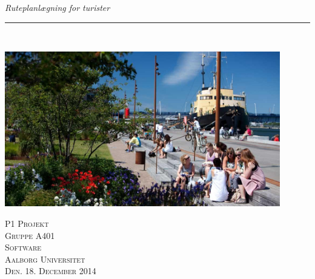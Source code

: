 \thispagestyle{empty}
\begin{flushright}
\vspace{3cm}

\phantom{hul}

\phantom{hul}

\phantom{hul}

\textsl{\Huge Ruteplanlægning for turister} \\ \vspace{1cm}

\rule{13cm}{3mm} \\ \vspace{1.5cm}
\vspace{1cm}

\includegraphics[width=0.90\textwidth]{billeder/aalborghavnefront}
\vspace{4cm}

\vspace{2cm} 
\textsc{\Large P1 Projekt \\
Gruppe A401 \\
Software\\
Aalborg Universitet\\
Den. 18. December 2014\\}
\end{flushright}
